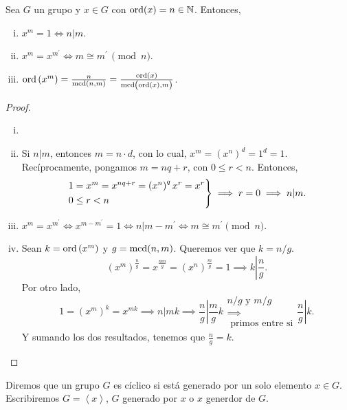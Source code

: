 \begin{lema}
    Sea $G$ un grupo y $x \in G$ con $\operatorname{ord}(x) = n\in\mathbb{N}$. Entonces,
    \begin{enumerate}[i)]
        \item $x^m = 1 \iff n \vert m$.
        \item $x^m = x^{m^\prime} \iff m \cong m^\prime \, \pmod{n}$.
        \item $\operatorname{ord}\left( x^m \right) = \frac{n}{\operatorname{mcd}(n, m)} = \frac{\operatorname{ord}(x)}{\operatorname{mcd}\left( \operatorname{ord}(x), m \right)}$.
    \end{enumerate}
\end{lema}

\begin{proof}
    \begin{enumerate}[i)]
        \item[]
        \item Si $n \vert m$, entonces $m = n \cdot d$, con lo cual, $x^m = \left( x^n \right)^d = 1^d = 1$. Recíprocamente, pongamos $m = nq + r$, con $0 \leq r < n$. Entonces,
            \[
                \begin{rcases}
                    1 = x^m = x^{nq + r} = \left( x^n \right)^q x^r = x^r \\
                    0 \leq r < n
                \end{rcases}
                \implies r = 0 \implies n \vert m.
            \]
        \item $x^m = x^{m^\prime} \iff x^{m - m^\prime} = 1 \iff n \vert m - m^\prime \iff
            m \cong m^\prime \pmod{n}$.
        \item Sean $k = \operatorname{ord}\left( x^m \right)$ y $g = \operatorname{mcd}(n, m)$. Queremos ver que $k = n/g$.
            \[
                \left( x^m \right)^{\frac{n}{g}} = x^{\frac{mn}{g}} = \left( x^n \right)^{\frac{m}{g}} = 1
                \implies k \left\vert \frac{n}{g} \right. .
            \]
            Por otro lado,
            \[
                1 = \left( x^m \right)^k = x^{mk} \implies n \vert mk \implies \left.\frac{n}{g} \right\vert \frac{m}{g} k
                \substack{n/g \text{ y } m/g \\ \implies \\ \text{ primos entre si}} \left.\frac{n}{g} \right\vert k.
            \]
            Y sumando los dos resultados, tenemos que $\frac{n}{g} = k$.
    \end{enumerate}
\end{proof}

\begin{defi}
    Diremos que un grupo $G$ es cíclico si está generado por un solo elemento $x \in G$. Escribiremos $G = \left< x \right>$, $G$ generado por $x$ o $x$ generdor de $G$.
\end{defi}


